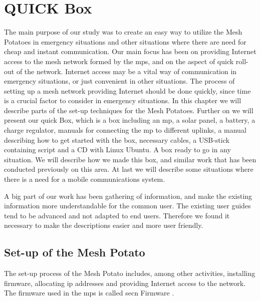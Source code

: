 \chapter{QUICK Box}
\label{chp:quickrollout} 

The main purpose of our study was to create an easy way to utilize the Mesh Potatoes in emergency situations and other situations where there are need for cheap and instant communication. Our main focus has been on providing Internet access to the mesh network formed by the \glspl{mp}, and on the aspect of quick roll-out of the network. Internet access may be a vital way of communication in emergency situations, or just convenient in other situations. The process of setting up a mesh network providing Internet should be done quickly, since time is a crucial factor to consider in emergency situations. In this chapter we will describe parts of the set-up techniques for the Mesh Potatoes. Further on we will present our \gls{quick} Box, which is a box including an \gls{mp}, a solar panel, a battery, a charge regulator, manuals for connecting the \gls{mp} to different uplinks, a manual describing how to get started with the box, necessary cables, a USB-stick containing script and a CD with Linux Ubuntu. A box ready to go in any situation. We will describe how we made this box, and similar work that has been conducted previously on this area. At last we will describe some situations where there is a need for a mobile communications system.

A big part of our work has been gathering of information, and make the existing information more understandable for the common user. The existing user guides tend to be advanced and not adapted to end users. Therefore we found it necessary to make the descriptions easier and more user friendly. 

\section{Set-up of the Mesh Potato}
The set-up process of the Mesh Potato includes, among other activities, installing firmware, allocating \gls{ip} addresses and providing Internet access to the network. The firmware used in the \glspl{mp} is called \gls{secn} Firmware \cite{ChoosingFirmware}. 


